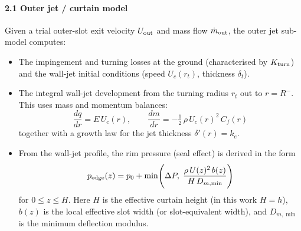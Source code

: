 \documentclass[11pt,a4paper]{article}
\begin{document}
\paragraph{2.1 Outer jet / curtain model}  
Given a trial outer-slot exit velocity \(U_{\rm out}\) and mass flow \(\dot m_{\rm out}\), the outer jet sub-model computes:
\begin{itemize}
  \item The impingement and turning losses at the ground (characterised by \(K_{\rm turn}\)) and the wall-jet initial conditions (speed \(U_c(r_t)\), thickness \(\delta_t\)).
  \item The integral wall-jet development from the turning radius \(r_t\) out to \(r=R^{-}\). This uses mass and momentum balances:
    \[
      \frac{d q}{dr} = E\,U_c(r), 
      \qquad
      \frac{d m}{dr} = -\tfrac12\,\rho\,U_c(r)^2\,C_f(r)
    \]
    together with a growth law for the jet thickness \(\delta'(r)=k_e\).  
  \item From the wall-jet profile, the rim pressure (seal effect) is derived in the form  
    \[
      p_{\rm edge}(z) = p_0 + \min\!\Bigg(\Delta P,\;\frac{\rho\,U(z)^2\,b(z)}{H\,D_{m,\min}}\Bigg)
      \]
    for \(0\le z\le H\). Here \(H\) is the effective curtain height (in this work \(H=h\)), \(b(z)\) is the local effective slot width (or slot-equivalent width), and \(D_{m,\min}\) is the minimum deflection modulus.  
\end{itemize}
\end{document}
